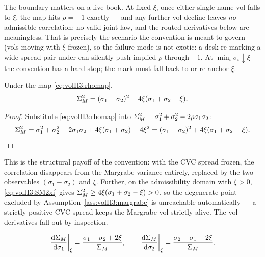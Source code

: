The boundary matters on a live book. At fixed $\xi$, once either single-name
vol falls to $\xi$, the map hits $\rho = -1$ exactly --- and any further vol
decline leaves \emph{no} admissible correlation: no valid joint law, and the
routed derivatives below are meaningless. That is precisely the scenario the
convention is meant to govern (vols moving with $\xi$ frozen), so the failure
mode is not exotic: a desk re-marking a wide-spread pair under \stickycvc{}
can silently push implied $\rho$ through $-1$. At $\min_i \sigma_i \downarrow
\xi$ the convention has a hard stop; the mark must fall back to \stickyrho{}
or re-anchor $\xi$.

\begin{proposition}\label{prop:volII3:SM2xi}
Under the map \eqref{eq:volII3:rhomap},
\begin{equation}\label{eq:volII3:SM2xi}
\Sigma_M^2 = (\sigma_1 - \sigma_2)^2 + 4\xi(\sigma_1 + \sigma_2 - \xi) .
\end{equation}
\end{proposition}

\begin{proof}
Substitute \eqref{eq:volII3:rhomap} into
$\Sigma_M^2 = \sigma_1^2 + \sigma_2^2 - 2\rho\sigma_1\sigma_2$:
\begin{equation}\label{eq:volII3:SM2xistep}
\Sigma_M^2
= \sigma_1^2 + \sigma_2^2 - 2\sigma_1\sigma_2
+ 4\xi(\sigma_1 + \sigma_2) - 4\xi^2
= (\sigma_1 - \sigma_2)^2 + 4\xi(\sigma_1 + \sigma_2 - \xi) . \qedhere
\end{equation}
\end{proof}

This is the structural payoff of the \stickycvc{} convention: with the CVC
spread frozen, the correlation disappears from the Margrabe variance entirely,
replaced by the two observables $(\sigma_1 - \sigma_2)$ and $\xi$. Further,
on the admissibility domain with $\xi > 0$,
\eqref{eq:volII3:SM2xi} gives $\Sigma_M^2 \ge 4\xi(\sigma_1 + \sigma_2 - \xi)
> 0$, so the degenerate point excluded by
Assumption~\ref{ass:volII3:margrabe} is unreachable automatically --- a
strictly positive CVC spread keeps the Margrabe vol strictly alive. The vol
derivatives fall out by inspection.

\begin{corollary}
\label{cor:volII3:dSMxi}
\begin{equation}\label{eq:volII3:dSMxi}
\left.\frac{\mathrm{d} \Sigma_M}{\mathrm{d} \sigma_1}\right|_{\xi} = \frac{\sigma_1 - \sigma_2 + 2\xi}{\Sigma_M},
\qquad
\left.\frac{\mathrm{d} \Sigma_M}{\mathrm{d} \sigma_2}\right|_{\xi} = \frac{\sigma_2 - \sigma_1 + 2\xi}{\Sigma_M}.
\end{equation}
\end{corollary}

